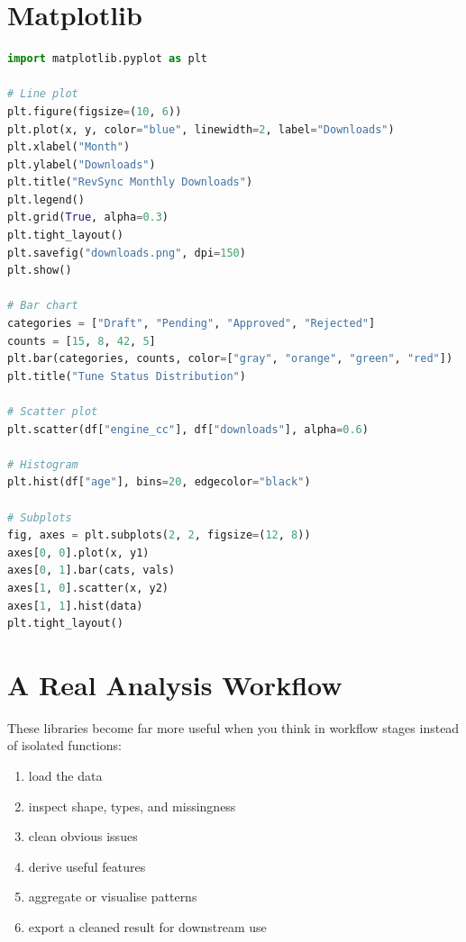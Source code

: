 \documentclass[12pt, a4paper, oneside]{book}
\begin{document}
\section{Matplotlib}

\begin{lstlisting}[language=Python, caption={Matplotlib essentials}]
import matplotlib.pyplot as plt

# Line plot
plt.figure(figsize=(10, 6))
plt.plot(x, y, color="blue", linewidth=2, label="Downloads")
plt.xlabel("Month")
plt.ylabel("Downloads")
plt.title("RevSync Monthly Downloads")
plt.legend()
plt.grid(True, alpha=0.3)
plt.tight_layout()
plt.savefig("downloads.png", dpi=150)
plt.show()

# Bar chart
categories = ["Draft", "Pending", "Approved", "Rejected"]
counts = [15, 8, 42, 5]
plt.bar(categories, counts, color=["gray", "orange", "green", "red"])
plt.title("Tune Status Distribution")

# Scatter plot
plt.scatter(df["engine_cc"], df["downloads"], alpha=0.6)

# Histogram
plt.hist(df["age"], bins=20, edgecolor="black")

# Subplots
fig, axes = plt.subplots(2, 2, figsize=(12, 8))
axes[0, 0].plot(x, y1)
axes[0, 1].bar(cats, vals)
axes[1, 0].scatter(x, y2)
axes[1, 1].hist(data)
plt.tight_layout()
\end{lstlisting}

\section{A Real Analysis Workflow}

These libraries become far more useful when you think in workflow stages instead of isolated functions:
\begin{enumerate}[leftmargin=2em]
    \item load the data
    \item inspect shape, types, and missingness
    \item clean obvious issues
    \item derive useful features
    \item aggregate or visualise patterns
    \item export a cleaned result for downstream use
\end{enumerate}
\end{document}
